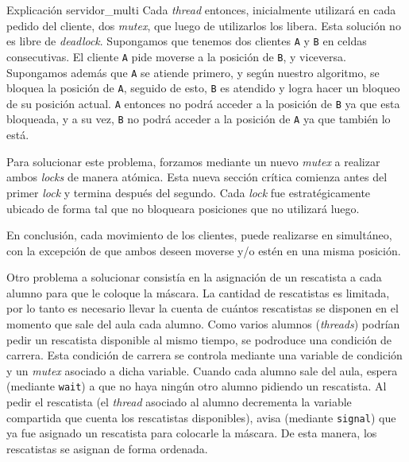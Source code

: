 \documentclass[12pt,titlepage]{article}
\newcommand{\code}[1]{\texttt{#1}}
\newcommand{\kw}[1]{{\em #1}}
\begin{document}
\begin{section}{Explicación servidor\_multi}
	Cada \kw{thread} entonces, inicialmente utilizará en cada pedido del cliente, dos \kw{mutex}, que luego de utilizarlos los libera. Esta solución no es libre de \kw{deadlock}. Supongamos que tenemos dos clientes \code{A} y \code{B} en celdas consecutivas. El cliente \code{A} pide moverse a la posición de \code{B}, y viceversa. Supongamos además que \code{A} se atiende primero, y según nuestro algoritmo, se bloquea la posición de \code{A}, seguido de esto, \code{B} es atendido y logra hacer un bloqueo de su posición actual. \code{A} entonces no podrá acceder a la posición de \code{B} ya que esta bloqueada, y a su vez, \code{B} no podrá acceder a la posición de \code{A} ya que también lo está. 
	
	Para solucionar este problema, forzamos mediante un nuevo \kw{mutex} a realizar ambos \kw{locks} de manera atómica. Esta nueva sección crítica comienza antes del primer \kw{lock} y termina después del segundo. Cada \kw{lock} fue estratégicamente ubicado de forma tal que no bloqueara posiciones que no utilizará luego.
	
	En conclusión, cada movimiento de los clientes, puede realizarse en simultáneo, con la excepción de que ambos deseen moverse y/o estén en una misma posición.

	Otro problema a solucionar consistía en la asignación de un rescatista a cada alumno para que le coloque la máscara. La cantidad de rescatistas es limitada, por lo tanto es necesario llevar la cuenta de cuántos rescatistas se disponen en el momento que sale del aula cada alumno. Como varios alumnos (\kw{threads}) podrían pedir un rescatista disponible al mismo tiempo, se podroduce una condición de carrera. Esta condición de carrera se controla mediante una variable de condición y un \kw{mutex} asociado a dicha variable. Cuando cada alumno sale del aula, espera (mediante \code{wait}) a que no haya ningún otro alumno pidiendo un rescatista. Al pedir el rescatista (el \kw{thread} asociado al alumno decrementa la variable compartida que cuenta los rescatistas disponibles), avisa (mediante \code{signal}) que ya fue asignado un rescatista para colocarle la máscara. De esta manera, los rescatistas se asignan de forma ordenada.
	
\end{section}
\end{document}
